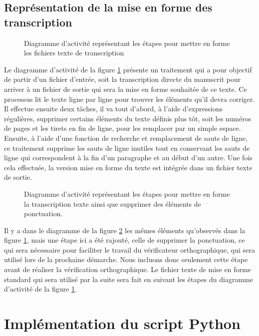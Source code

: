 \subsection{Représentation de la mise en forme des transcription}
\begin{figure}[p]
    \centering
    \caption{Diagramme d'activité représentant les étapes pour mettre en forme les fichiers texte de transcription}
    \label{fig:etape3}
\end{figure}
Le diagramme d'activité de la figure \ref{fig:etape3} présente un traitement qui a pour objectif de partir d'un fichier d'entrée, soit la transcription directe du manuscrit pour arriver à un fichier de sortie qui sera la mise en forme souhaitée de ce texte. Ce processus lit le texte ligne par ligne pour trouver les éléments qu'il devra corriger. Il effectue ensuite deux tâches, il va tout d'abord, à l'aide d'expressions régulières, supprimer certains éléments du texte définis plus tôt, soit les numéros de pages et les tirets en fin de ligne, pour les remplacer par un simple espace. Ensuite, à l'aide d'une fonction de recherche et remplacement de sauts de ligne, ce traitement supprime les sauts de ligne inutiles tout en conservant les sauts de ligne qui correspondent à la fin d'un paragraphe et au début d'un autre. Une fois cela effectuée, la version mise en forme du texte est intégrée dans un fichier texte de sortie.
\begin{figure}[p]
    \centering
    \caption{Diagramme d'activité représentant les étapes pour mettre en forme la transcription texte ainsi que supprimer des éléments de ponctuation.}
    \label{fig:etape1}
\end{figure}
Il y a dans le diagramme de la figure \ref{fig:etape1} les mêmes éléments qu'observés dans la figure \ref{fig:etape3}, mais une étape ici a été rajouté, celle de supprimer la ponctuation, ce qui sera nécessaire pour faciliter le travail du vérificateur orthographique, qui sera utilisé lors de la prochaine démarche. Nous incluons donc seulement cette étape avant de réaliser la vérification orthographique. Le fichier texte de mise en forme standard qui sera utilisé par la suite sera fait en suivant les étapes du diagramme d'activité de la figure \ref{fig:etape3}.

\section{Implémentation du script Python}
